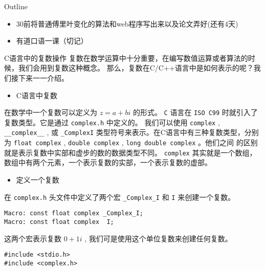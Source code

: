 \documentclass[presentation]{beamer}
\date{\today}
\title{}
\begin{document}
\begin{frame}{Outline}
\tableofcontents
\end{frame}

\begin{frame}[label={sec:org4adfcd3}]{}
\begin{itemize}
\item 30前将普通傅里叶变化的算法和web程序写出来以及论文弄好(还有4天)
\item 有道口语一课（切记）
\end{itemize}
\end{frame}


\begin{frame}[fragile,label={sec:org77cb714}]{}
 \begin{block}{C语言中的复数操作}
 复数在数学运算中十分重要，在编写数值运算或者算法的时候，我们会用到复数这种概念。
那么，复数在C/C++语言中是如何表示的呢？我们接下来一一介绍。

\begin{itemize}
\item C语言中复数
\end{itemize}

 在数学中一个复数可以定义为 \(z=a + bi\) 的形式。 \texttt{C} 语言在 \texttt{ISO C99} 时就引入了复数类型。它是通过 \texttt{complex.h} 中定义的。
我们可以使用 \texttt{complex} , \texttt{\_\_complex\_\_} , 或 \texttt{\_ComplexI} 类型符号来表示。在C语言中有三种复数类型，分别为 \texttt{float complex} , \texttt{double complex} , \texttt{long double complex} 。他们之间
的区别就是表示复数中实部和虚步的数的数据类型不同。 \texttt{complex} 其实就是一个数组，数组中有两个元素，一个表示复数的实部，一个表示复数的虚部。

\begin{itemize}
\item 定义一个复数
\end{itemize}

 在 \texttt{complex.h} 头文件中定义了两个宏 \texttt{\_Complex\_I} 和 \texttt{I} 来创建一个复数。

\begin{verbatim}
Macro: const float complex _Complex_I;
Macro: const float complex  I;
\end{verbatim}



 这两个宏表示复数 \(0+1i\) , 我们可是使用这个单位复数来创建任何复数。

\begin{verbatim}
#include <stdio.h>
#include <complex.h>


\end{verbatim}
\end{block}
\end{frame}
\end{document}
